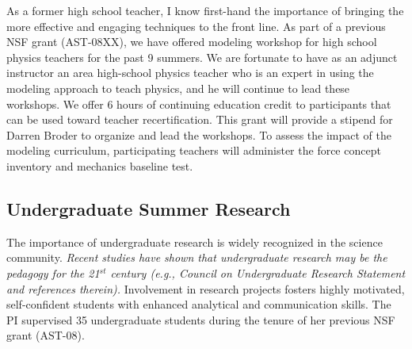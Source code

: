 \documentclass[11pt, preprint]{aastex}
\begin{document}
{As a former high school teacher, I know first-hand the importance of 
bringing the more effective and engaging techniques to the front line.
As part of a previous NSF grant (AST-08XX), we have offered 
modeling workshop for high school physics teachers for the past 9 summers.
We are fortunate
to have as an adjunct instructor an area high-school physics teacher who
is an expert in using the modeling approach to teach physics, and
he will continue to lead these workshops.  
We offer 6 hours of continuing education credit to participants 
that can be used toward teacher recertification.
This grant will provide a stipend for Darren Broder to organize and lead
the workshops.  
To assess the impact of the modeling curriculum, participating teachers
will administer the force concept inventory and mechanics baseline test.


\vspace*{-.7cm}
\subsection{Undergraduate Summer Research}
\vspace*{-.4cm}
The importance of undergraduate research is widely recognized
in the science community.
{\em Recent studies have shown that undergraduate research may be the
pedagogy for the 21$^{st}$ century (e.g., Council on Undergraduate Research
Statement and references therein).}
Involvement in research projects
fosters highly motivated, self-confident students with enhanced
analytical and communication skills. 
The PI supervised 35 undergraduate students during the tenure of her
previous NSF grant (AST-08).

}
\end{document}
